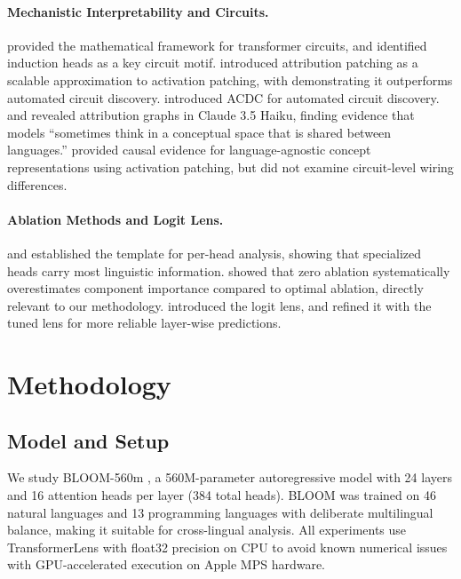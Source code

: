 \documentclass[11pt]{article}
\begin{document}
\paragraph{Mechanistic Interpretability and Circuits.}
\citet{elhage2021mathematical} provided the mathematical framework for transformer circuits, and \citet{olsson2022incontext} identified induction heads as a key circuit motif.
\citet{nanda2023attribution} introduced attribution patching as a scalable approximation to activation patching, with \citet{syed2024attribution} demonstrating it outperforms automated circuit discovery.
\citet{conmy2023towards} introduced ACDC for automated circuit discovery.
\citet{anthropic2025circuit} and \citet{anthropic2025biology} revealed attribution graphs in Claude 3.5 Haiku, finding evidence that models ``sometimes think in a conceptual space that is shared between languages.''
\citet{dumas2025separating} provided causal evidence for language-agnostic concept representations using activation patching, but did not examine circuit-level wiring differences.

\paragraph{Ablation Methods and Logit Lens.}
\citet{clark2019what} and \citet{voita2019analyzing} established the template for per-head analysis, showing that specialized heads carry most linguistic information.
\citet{li2024optimal} showed that zero ablation systematically overestimates component importance compared to optimal ablation, directly relevant to our methodology.
\citet{nostalgebraist2020logitlens} introduced the logit lens, and \citet{belrose2023tuned} refined it with the tuned lens for more reliable layer-wise predictions.

\section{Methodology}
\label{sec:methodology}

\subsection{Model and Setup}

We study BLOOM-560m \cite{scao2022bloom}, a 560M-parameter autoregressive model with 24 layers and 16 attention heads per layer (384 total heads).
BLOOM was trained on 46 natural languages and 13 programming languages with deliberate multilingual balance, making it suitable for cross-lingual analysis.
All experiments use TransformerLens \cite{nanda2022transformerlens} with float32 precision on CPU to avoid known numerical issues with GPU-accelerated execution on Apple MPS hardware.
\end{document}
